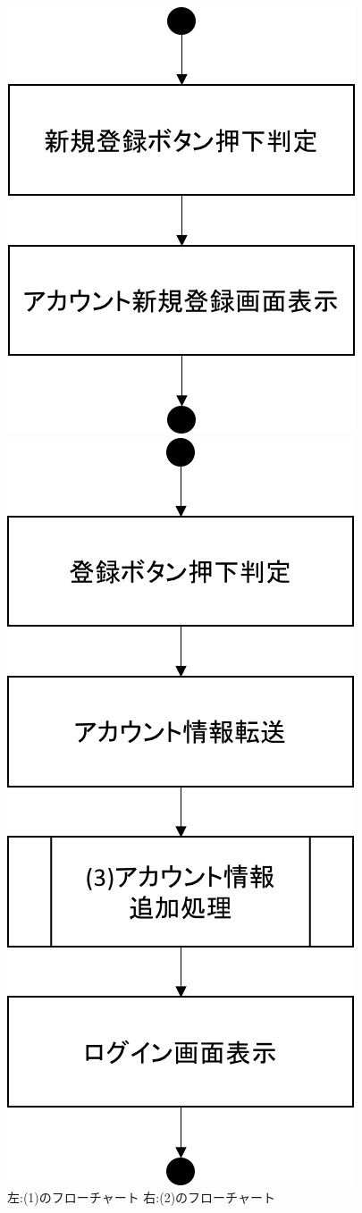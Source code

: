 \begin{figure}[htbp]
 \begin{minipage}{0.5\hsize}
  \begin{center}
   \includegraphics[width=0.5\linewidth,clip]{./img/flow/1.png}
  \end{center}
 \end{minipage}
 \begin{minipage}{0.5\hsize}
  \begin{center}
   \includegraphics[width=0.5\linewidth,clip]{./img/flow/2.png}
  \end{center}
 \end{minipage}
 \caption{左:(1)のフローチャート 右:(2)のフローチャート}\label{fig:1to2}
\end{figure}

